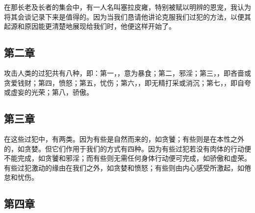在那长老及长者的集会中，有一人名叫塞拉皮雍，特别被赋以明辨的恩宠，我认为将其会谈记录下来是值得的。因为当我们恳请他讲论克服我们过犯的方法，以便其起源和原因能更清楚地展现给我们时，他便这样开始了。\par


\subsection{第二章}

\par

攻击人类的过犯共有八种，即：第一，，意为暴食；第二，邪淫；第三，，即吝啬或贪爱钱财；第四，愤怒；第五，忧伤；第六，，即无精打采或消沉；第七，，即自夸或虚妄的光荣；第八，骄傲。\par


\subsection{第三章}

\par

在这些过犯中，有两类。因为有些是自然而来的，如贪饕；有些则是在本性之外的，如贪婪。但它们作用于我们的方式有四种。因为有些过犯若没有肉体的行动便不能完成，如贪饕和邪淫；而有些则无需任何身体行动便可完成，如骄傲和虚荣。有些过犯激动的缘由在我们之外，如贪婪和愤怒；有些则由内心感受所激起，如倦怠和忧伤。\par


\subsection{第四章}

\par

